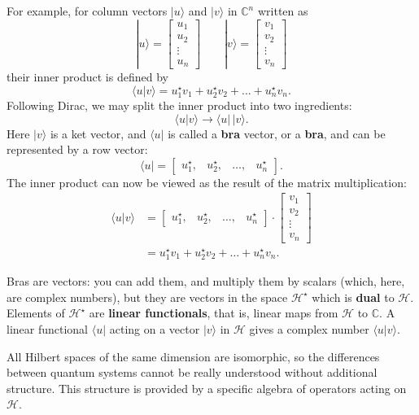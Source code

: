 \documentclass[fleqn]{article}
\newenvironment{idea}{\noindent}{\medskip}
\begin{document}
For example, for column vectors \(|u\rangle\) and \(|v\rangle\) in \(\mathbb{C}^n\) written as
\[
  |u\rangle
  = \begin{bmatrix}u_1\\u_2\\\vdots\\u_n\end{bmatrix}
  \qquad
  |v\rangle
  = \begin{bmatrix}v_1\\v_2\\\vdots\\v_n\end{bmatrix}
\]
their inner product is defined by
\[
  \langle u|v\rangle
  = u_1^\star v_1 + u_2^\star v_2+\ldots + u_n^\star v_n.
\]
Following Dirac, we may split the inner product into two ingredients:
\[
  \langle u|v\rangle
  \longrightarrow \langle u|\,|v\rangle.
\]
Here \(|v\rangle\) is a ket vector, and \(\langle u|\) is called a \textbf{bra} vector, or a \textbf{bra}, and can be represented by a row vector:
\[
  \langle u|
  = \begin{bmatrix}u_1^\star,&u_2^\star,&\ldots,&u_n^\star\end{bmatrix}.
\]
The inner product can now be viewed as the result of the matrix multiplication:
\[
  \begin{aligned}
    \langle u|v\rangle
    &= \begin{bmatrix}u_1^\star,&u_2^\star,&\ldots,&u_n^\star\end{bmatrix}
    \cdot \begin{bmatrix}v_1\\v_2\\\vdots\\v_n\end{bmatrix}
  \\&= u_1^\star v_1 + u_2^\star v_2 + \ldots + u_n^\star v_n.
  \end{aligned}
\]

Bras are vectors: you can add them, and multiply them by scalars (which, here, are complex numbers), but they are vectors in the space \({\mathcal{H}}^\star\) which is \textbf{dual} to \(\mathcal{H}\).
Elements of \({\mathcal{H}}^\star\) are \textbf{linear functionals}, that is, linear maps from \(\mathcal{H}\) to \(\mathbb{C}\).
A linear functional \(\langle u|\) acting on a vector \(|v\rangle\) in \(\mathcal{H}\) gives a complex number \(\langle u|v\rangle\).

\begin{idea}
All Hilbert spaces of the same dimension are isomorphic, so the differences between quantum systems cannot be really understood without additional structure. This structure is provided by a specific algebra of operators acting on \(\mathcal{H}\).

\end{idea}
\end{document}
